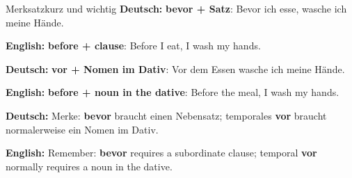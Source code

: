 \documentclass[a4paper,11pt]{article}
\newcommand{\GermanText}[1]{\textbf{Deutsch: }#1\par}
\newcommand{\EnglishText}[1]{{\small\color{SoftGray}\textbf{English: }#1\par}}
\begin{document}
        \begin{grammarentry}{Merksatz}{kurz und wichtig}
            \GermanText{\textbf{bevor + Satz}: Bevor ich esse, wasche ich meine Hände.}
            \EnglishText{\textbf{before + clause}: Before I eat, I wash my hands.}

            \GermanText{\textbf{vor + Nomen im Dativ}: Vor dem Essen wasche ich meine Hände.}
            \EnglishText{\textbf{before + noun in the dative}: Before the meal, I wash my hands.}

            \GermanText{Merke: \textbf{bevor} braucht einen Nebensatz; temporales \textbf{vor} braucht normalerweise ein Nomen im Dativ.}
            \EnglishText{Remember: \textbf{bevor} requires a subordinate clause; temporal \textbf{vor} normally requires a noun in the dative.}
        \end{grammarentry}
\end{document}
